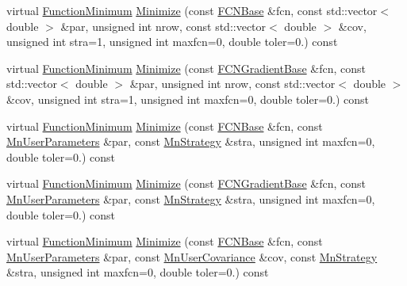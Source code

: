 \begin{DoxyCompactItemize}
\item 
virtual \mbox{\hyperlink{classROOT_1_1Minuit2_1_1FunctionMinimum}{Function\+Minimum}} \mbox{\hyperlink{classROOT_1_1Minuit2_1_1FumiliMinimizer_ac2cff69bc8ac1702179b9e17288095a8}{Minimize}} (const \mbox{\hyperlink{classROOT_1_1Minuit2_1_1FCNBase}{F\+C\+N\+Base}} \&fcn, const std\+::vector$<$ double $>$ \&par, unsigned int nrow, const std\+::vector$<$ double $>$ \&cov, unsigned int stra=1, unsigned int maxfcn=0, double toler=0.) const
\item 
virtual \mbox{\hyperlink{classROOT_1_1Minuit2_1_1FunctionMinimum}{Function\+Minimum}} \mbox{\hyperlink{classROOT_1_1Minuit2_1_1FumiliMinimizer_aa17be65e26311aa25f6fd3680f747958}{Minimize}} (const \mbox{\hyperlink{classROOT_1_1Minuit2_1_1FCNGradientBase}{F\+C\+N\+Gradient\+Base}} \&fcn, const std\+::vector$<$ double $>$ \&par, unsigned int nrow, const std\+::vector$<$ double $>$ \&cov, unsigned int stra=1, unsigned int maxfcn=0, double toler=0.) const
\item 
virtual \mbox{\hyperlink{classROOT_1_1Minuit2_1_1FunctionMinimum}{Function\+Minimum}} \mbox{\hyperlink{classROOT_1_1Minuit2_1_1FumiliMinimizer_a22c4059fb94d5e40c843ac90440d2975}{Minimize}} (const \mbox{\hyperlink{classROOT_1_1Minuit2_1_1FCNBase}{F\+C\+N\+Base}} \&fcn, const \mbox{\hyperlink{classROOT_1_1Minuit2_1_1MnUserParameters}{Mn\+User\+Parameters}} \&par, const \mbox{\hyperlink{classROOT_1_1Minuit2_1_1MnStrategy}{Mn\+Strategy}} \&stra, unsigned int maxfcn=0, double toler=0.) const
\item 
virtual \mbox{\hyperlink{classROOT_1_1Minuit2_1_1FunctionMinimum}{Function\+Minimum}} \mbox{\hyperlink{classROOT_1_1Minuit2_1_1FumiliMinimizer_a2b14890a2b40ae8db356b71be505ce66}{Minimize}} (const \mbox{\hyperlink{classROOT_1_1Minuit2_1_1FCNGradientBase}{F\+C\+N\+Gradient\+Base}} \&fcn, const \mbox{\hyperlink{classROOT_1_1Minuit2_1_1MnUserParameters}{Mn\+User\+Parameters}} \&par, const \mbox{\hyperlink{classROOT_1_1Minuit2_1_1MnStrategy}{Mn\+Strategy}} \&stra, unsigned int maxfcn=0, double toler=0.) const
\item 
virtual \mbox{\hyperlink{classROOT_1_1Minuit2_1_1FunctionMinimum}{Function\+Minimum}} \mbox{\hyperlink{classROOT_1_1Minuit2_1_1FumiliMinimizer_a954728eb57315bb43039fe2ba71f4098}{Minimize}} (const \mbox{\hyperlink{classROOT_1_1Minuit2_1_1FCNBase}{F\+C\+N\+Base}} \&fcn, const \mbox{\hyperlink{classROOT_1_1Minuit2_1_1MnUserParameters}{Mn\+User\+Parameters}} \&par, const \mbox{\hyperlink{classROOT_1_1Minuit2_1_1MnUserCovariance}{Mn\+User\+Covariance}} \&cov, const \mbox{\hyperlink{classROOT_1_1Minuit2_1_1MnStrategy}{Mn\+Strategy}} \&stra, unsigned int maxfcn=0, double toler=0.) const

\end{DoxyCompactItemize}
